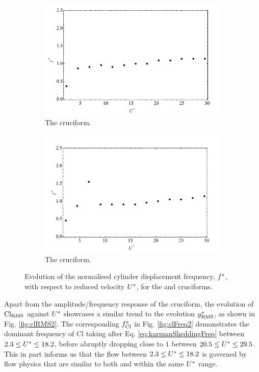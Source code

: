 \documentclass[oneside]{utmthesis}
\begin{document}
\begin{figure}
  \centering
  \begin{subfigure}[h]{1\textwidth}
    \includegraphics[width=\textwidth]{figs/yStrFreq2}
    \caption{The \angtw{} cruciform.}
    \label{fig:yStrFreq2}
  \end{subfigure}
  
  \begin{subfigure}[h]{1\textwidth}
    \includegraphics[width=\textwidth]{figs/yStrFreq1}
    \caption{The \angon{} cruciform.}
    \label{fig:yStrFreq1}
  \end{subfigure}

  \caption{Evolution of the normalised cylinder displacement frequency, $f^{*}$, with respect to reduced velocity $U^{*}$, for the \angtw{} and \angon{} cruciforms.}
  \label{fig:yStrFreq21}
\end{figure}
Apart from the amplitude/frequency response of the \angtw{} cruciform, the evolution of $\text{Cl}_{\text{RMS}}$ against $U^{*}$ showcases a similar trend to the evolution $y^{*}_{\text{RMS}}$, as shown in Fig. \ref{fig:clRMS2}. The corresponding $f_{\text{Cl}}^{*}$ in Fig. \ref{fig:clFreq2} demonstrates the dominant frequency of Cl taking after Eq. \ref{eq:karmanSheddingFreq} between $2.3 \leq U^{*} \leq 18.2$, before abruptly dropping close to $1$ between $20.5 \leq U^{*} \leq 29.5$. This in part informs us that the flow between $2.3 \leq U^{*} \leq 18.2$ is governed by flow physics that are similar to both \angfo{} and \angth{} within the same $U^{*}$ range.
\end{document}
